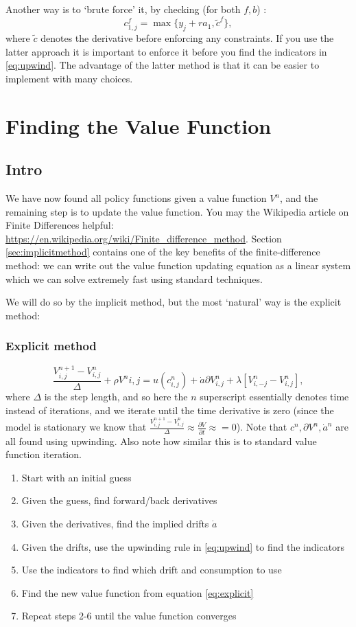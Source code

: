 \documentclass[12pt]{article}
\DeclareMathOperator{\1}{\mathbbm{1}}
\begin{document}
    Another way is to `brute force' it, by checking     (for both $f,b$) :
    $$c_{1,j}^f=\max\{y_j+r a_1,\tilde c^f\},$$
where $\tilde c$ denotes the derivative before enforcing any constraints. If you use the latter approach it is important to enforce it before you find the indicators in \eqref{eq:upwind}. The advantage of the latter method is that it can be easier to implement with many choices.
    
    
	
\section{Finding the Value Function}
\subsection{Intro}
We have now found all policy functions given a value function $V^n$, and the remaining step is to update the value function. You may the Wikipedia article on Finite Differences helpful: \url{https://en.wikipedia.org/wiki/Finite_difference_method}. Section \ref{sec:implicitmethod} contains one of the key benefits of the finite-difference method: we can write out the value function updating equation as a linear system which we can solve extremely fast using standard techniques.

We will do so by the implicit method, but the most `natural' way is the explicit method:
\subsubsection{Explicit method}
\begin{equation}\label{eq:explicit}
\frac{V^{n+1}_{i,j} - V^n_{i,j}}\Delta + \rho V^n{i,j} =u(c^n_{i,j}) + \dot a \partial V^n_{i,j} + \lambda [V^n_{i,-j} - V^n_{i,j}],
\end{equation}
where $\Delta$ is the step length, and so here the $n$ superscript essentially denotes time instead of iterations, and we iterate until the time derivative is zero (since the model is stationary we know that $\frac{V^{n+1}_{i,j} - V^n_{i,j}}\Delta\approx \frac{\partial V}{\partial t}\approx =0$). Note that $c^n,\partial V^n, \dot a^n$ are all found using upwinding. Also note how similar this is to standard value function iteration.

\begin{enumerate}
\item Start with an initial guess
\item Given the guess, find forward/back derivatives
\item Given the derivatives, find the implied drifts $\dot a$
\item Given the drifts, use the upwinding rule in \eqref{eq:upwind} to find the indicators
\item Use the indicators to find which drift and consumption to use
\item Find the new value function from equation \eqref{eq:explicit}
\item Repeat steps 2-6 until the value function converges
\end{enumerate}
\end{document}
